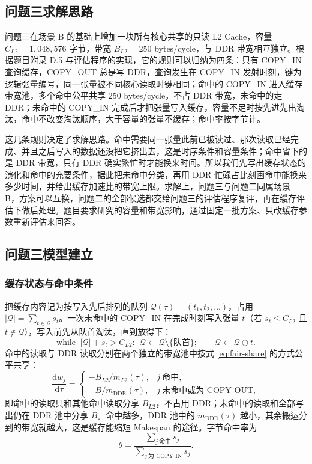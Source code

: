 \subsection{问题三求解思路}

问题三在场景 B 的基础上增加一块所有核心共享的只读 L2 Cache，容量 $C_{L2}=1{,}048{,}576$ 字节，带宽 $B_{L2}=250$ bytes/cycle，与 DDR 带宽相互独立。根据题目附录 D.5 与评估程序的实现，它的规则可以归纳为四条：只有 COPY\_IN 查询缓存，COPY\_OUT 总是写 DDR，查询发生在 COPY\_IN 发射时刻，键为逻辑张量编号，同一张量被不同核心读取时键相同；命中的 COPY\_IN 进入缓存带宽池，多个命中公平共享 250 bytes/cycle，不占 DDR 带宽，未命中的走 DDR；未命中的 COPY\_IN 完成后才把张量写入缓存，容量不足时按先进先出淘汰，命中不改变淘汰顺序，大于容量的张量不缓存；命中率按字节计。

这几条规则决定了求解思路。命中需要同一张量此前已被读过、那次读取已经完成、并且之后写入的数据还没把它挤出去，这是时序条件和容量条件；命中省下的是 DDR 带宽，只有 DDR 确实繁忙时才能换来时间。所以我们先写出缓存状态的演化和命中的充要条件，据此把未命中分类，再用 DDR 忙碌占比刻画命中能换来多少时间，并给出缓存加速比的带宽上限。求解上，问题三与问题二同属场景 B，方案可以互换，问题二的全部候选都交给问题三的评估程序复评，再在缓存评估下做后处理。题目要求研究的容量和带宽影响，通过固定一批方案、只改缓存参数重新评估来回答。

\subsection{问题三模型建立}\label{sec:p3-math}

\subsubsection{缓存状态与命中条件}

把缓存内容记为按写入先后排列的队列 $\mathcal{Q}(\tau)=(t_1,t_2,\dots)$，占用 $|\mathcal{Q}|=\sum_{t\in\mathcal{Q}}s_t$。一次未命中的 COPY\_IN 在完成时刻写入张量 $t$（若 $s_t\le C_{L2}$ 且 $t\notin\mathcal{Q}$），写入前先从队首淘汰，直到放得下：
\begin{equation}
  \text{while }\ |\mathcal{Q}|+s_t>C_{L2}:\ \ \mathcal{Q}\leftarrow\mathcal{Q}\setminus\{\text{队首}\};\qquad \mathcal{Q}\leftarrow\mathcal{Q}\oplus t .
  \label{eq:fifo}
\end{equation}
命中的读取与 DDR 读取分别在两个独立的带宽池中按式 \eqref{eq:fair-share} 的方式公平共享：
\begin{equation}
  \frac{\mathrm{d}w_j}{\mathrm{d}\tau}=
  \begin{cases}
  -B_{L2}/m_{L2}(\tau), & j\ \text{命中},\\
  -B/m_{\mathrm{DDR}}(\tau), & j\ \text{未命中或为 COPY\_OUT},
  \end{cases}
  \label{eq:pools}
\end{equation}
即命中的读取只和其他命中读取分享 $B_{L2}$，不占用 DDR；未命中的读取和全部写出仍在 DDR 池中分享 $B$。命中越多，DDR 池中的 $m_{\mathrm{DDR}}(\tau)$ 越小，其余搬运分到的带宽就越大，这是缓存能缩短 Makespan 的途径。字节命中率为
\begin{equation}
  \theta=\frac{\sum_{j\ \text{命中}} s_j}{\sum_{j\ \text{为 COPY\_IN}} s_j}.
  \label{eq:hitrate}
\end{equation}

